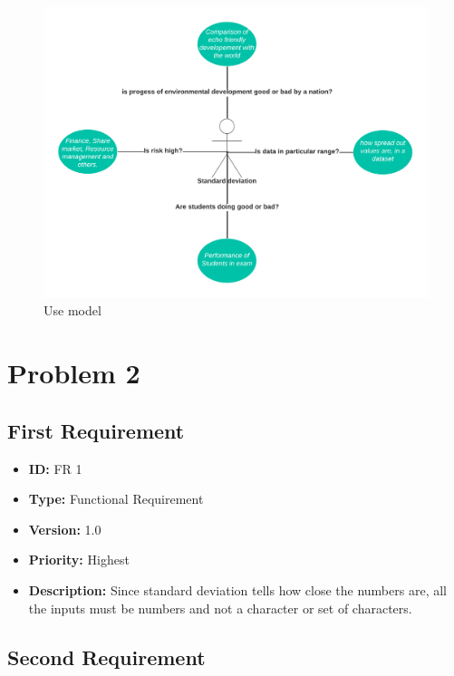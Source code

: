 \documentclass{scrartcl}
\begin{document}
\begin{figure}[H]
    \centering
    \includegraphics[width=1\textwidth]{Graphics/usecase.png}
    \caption{Use model}
    \label{fig:usemodel}
\end{figure}

\newpage

\section{Problem 2}

\vspace{0.5cm}
\subsection{First Requirement}

\begin{LARGE}
\begin{itemize}
  \item \textbf{ID:} FR 1 
  \item \textbf{Type:} Functional Requirement 
  \item \textbf{Version:} 1.0
  \item \textbf{Priority:} Highest
  \item \textbf{Description:} Since standard deviation tells how close the numbers are, all the inputs must be numbers and not a character or set of characters.
\end{itemize}
\end{LARGE}

\subsection{Second Requirement}
\end{document}
